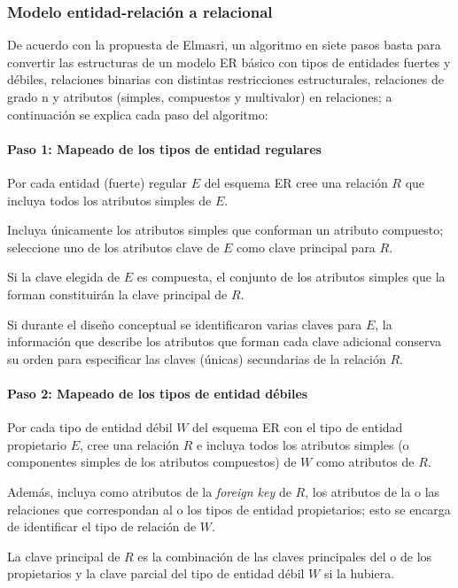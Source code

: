 \subsubsection{Modelo entidad-relación a relacional}\label{sec:erToSQL}
De acuerdo con la propuesta de Elmasri\cite{ramez_elmasri_fundamentos_nodate}, un algoritmo en siete pasos basta para convertir las estructuras de un modelo ER básico con tipos de entidades fuertes y débiles, relaciones binarias con distintas restricciones estructurales, relaciones de grado n y atributos (simples, compuestos y multivalor) en relaciones; a continuación se explica cada paso del algoritmo:

\paragraph*{Paso 1: Mapeado de los tipos de entidad regulares}
Por cada entidad (fuerte) regular $E$ del esquema ER cree una relación $R$ que incluya todos los atributos simples de $E$.


Incluya únicamente los atributos simples que conforman un atributo compuesto; seleccione uno de los atributos clave de $E$ como clave principal para $R$. 


Si la clave elegida de $E$ es compuesta, el conjunto de los atributos simples que la forman constituirán la clave principal de $R$.


Si durante el diseño conceptual se identificaron varias claves para $E$, la información que describe los atributos que forman cada clave adicional conserva su orden para especificar las claves (únicas) secundarias de la relación $R$. 

\paragraph*{Paso 2: Mapeado de los tipos de entidad débiles}
Por cada tipo de entidad débil $W$ del esquema ER con el tipo de entidad propietario $E$, cree una relación $R$ e incluya todos los atributos simples (o componentes simples de los atributos compuestos) de $W$ como atributos de $R$. 


Además, incluya como atributos de la \textit{foreign key} de $R$, los atributos de la o las relaciones que correspondan al o los tipos de entidad propietarios; esto se encarga de identificar el tipo de relación de $W$. 


La clave principal de $R$ es la combinación de las claves principales del o de los propietarios y la clave parcial del tipo de entidad débil $W$ si la hubiera.


